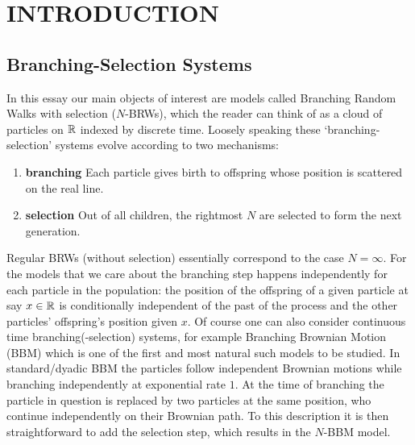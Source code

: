 \section{INTRODUCTION}

\subsection{Branching-Selection Systems}
In this essay our main objects of interest are models called Branching Random Walks with selection ($N$-BRWs), which the reader can think of as a cloud of particles on $\mathbb{R}$ indexed by discrete time. Loosely speaking these `branching-selection' systems evolve according to two mechanisms: 
\begin{enumerate}[1]
\item \textbf{branching} Each particle gives birth to offspring whose position is scattered on the real line. 
\item \vspace{-2mm}\textbf{selection} Out of all children, the rightmost $N$ are selected to form the next generation.
\end{enumerate}
Regular BRWs (without selection) essentially correspond to the case $N = \infty$. For the models that we care about the branching step happens independently for each particle in the population: the position of the offspring of a given particle at say $x \in \mathbb{R}$ is conditionally independent of the past of the process and the other particles' offspring's position given $x$. Of course one can also consider continuous time branching(-selection) systems, for example Branching Brownian Motion (BBM) which is one of the first and most natural such models to be studied. In standard/dyadic BBM the particles follow independent Brownian motions while branching independently at exponential rate $1$. At the time of branching the particle in question is replaced by two particles at the same position, who continue independently on their Brownian path. To this description it is then straightforward to add the selection step, which results in the $N$-BBM model. \\


